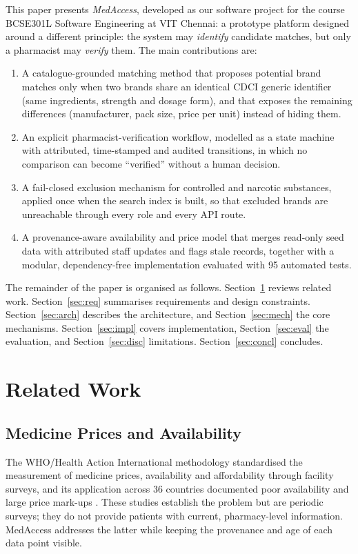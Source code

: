 \documentclass[conference]{IEEEtran}
\begin{document}
This paper presents \emph{MedAccess}, developed as our software project for the course BCSE301L Software Engineering at VIT Chennai: a prototype platform designed around a different principle: the system may \emph{identify} candidate matches, but only a pharmacist may \emph{verify} them. The main contributions are:
\begin{enumerate}
\item A catalogue-grounded matching method that proposes potential brand matches only when two brands share an identical CDCI generic identifier (same ingredients, strength and dosage form), and that exposes the remaining differences (manufacturer, pack size, price per unit) instead of hiding them.
\item An explicit pharmacist-verification workflow, modelled as a state machine with attributed, time-stamped and audited transitions, in which no comparison can become ``verified'' without a human decision.
\item A fail-closed exclusion mechanism for controlled and narcotic substances, applied once when the search index is built, so that excluded brands are unreachable through every role and every API route.
\item A provenance-aware availability and price model that merges read-only seed data with attributed staff updates and flags stale records, together with a modular, dependency-free implementation evaluated with 95 automated tests.
\end{enumerate}

The remainder of the paper is organised as follows. Section~\ref{sec:related} reviews related work. Section~\ref{sec:req} summarises requirements and design constraints. Section~\ref{sec:arch} describes the architecture, and Section~\ref{sec:mech} the core mechanisms. Section~\ref{sec:impl} covers implementation, Section~\ref{sec:eval} the evaluation, and Section~\ref{sec:disc} limitations. Section~\ref{sec:concl} concludes.

\section{Related Work}\label{sec:related}

\subsection{Medicine Prices and Availability}
The WHO/Health Action International methodology \cite{who2008} standardised the measurement of medicine prices, availability and affordability through facility surveys, and its application across 36 countries documented poor availability and large price mark-ups \cite{cameron2009}. These studies establish the problem but are periodic surveys; they do not provide patients with current, pharmacy-level information. MedAccess addresses the latter while keeping the provenance and age of each data point visible.
\end{document}
